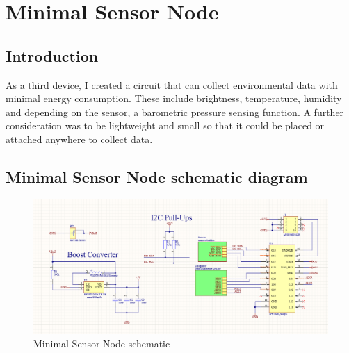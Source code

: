 \section{Minimal Sensor Node}

\subsection{Introduction}
As a third device, I created a circuit that can collect environmental data with minimal energy consumption. These include brightness, temperature, humidity and depending on the sensor, a barometric pressure sensing function. A further consideration was to be lightweight and small so that it could be placed or attached anywhere to collect data.

\subsection{Minimal Sensor Node schematic diagram}
\begin{figure}[!htb]
    \centering
    \includegraphics[width=\textwidth]{img/minimalsensornodeschematics.png}
    \caption{Minimal Sensor Node schematic}
    \label{fig:minimalsensornodeschematic}
\end{figure}

